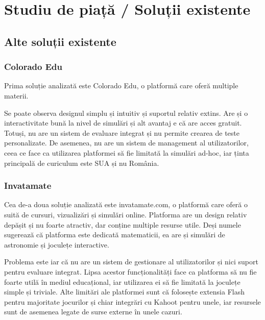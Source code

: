 \chapter{Studiu de piață / Soluții existente}
\label{chapter:studiuPiata}

\section{Alte soluții existente}
\label{sec:proj}
\subsection{Colorado Edu}

Prima soluție analizată este Colorado Edu, o platformă care oferă multiple materii.


Se poate observa designul simplu și intuitiv și suportul relativ extins. Are și o interactivitate bună la nivel de simulări și alt 
avantaj e că are acces gratuit. Totuși, nu are un sistem de evaluare integrat și nu permite crearea de teste personalizate. De asemenea, nu are
un sistem de management al utilizatorilor, ceea ce face ca utilizarea platformei să fie limitată la simulări ad-hoc, 
iar ținta principală de curiculum este SUA și nu România.

\subsection{Invatamate}

Cea de-a doua soluție analizată este invatamate.com, o platformă care oferă o suită de cursuri, vizualizări și simulări online.
Platforma are un design relativ depășit și nu foarte atractiv, dar
conține multiple resurse utile. Deși numele sugerează că platforma este dedicată matematicii, ea are și simulări de astronomie
și joculețe interactive.


Problema este iar că nu are un sistem de gestionare al utilizatorilor și nici suport pentru evaluare integrat.
Lipsa acestor funcționalități face ca platforma să nu fie foarte utilă în mediul educațional, iar utilizarea ei să fie limitată 
la joculețe simple și triviale. Alte limitări ale platformei sunt că folosește extensia Flash pentru majoritate
jocurilor și chiar integrări cu Kahoot pentru unele, iar resursele sunt de asemenea legate de surse externe în unele cazuri.

